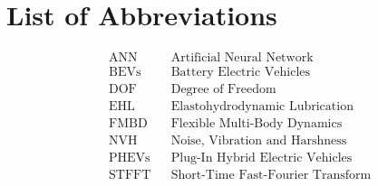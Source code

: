 
\chapter*{List of Abbreviations}
\begin{align*}
	&\text{ANN} &&\text{Artificial Neural Network}\\
	&\text{BEVs} &&\text{Battery Electric Vehicles}\\
	&\text{DOF} &&\text{Degree of Freedom}\\
	&\text{EHL} &&\text{Elastohydrodynamic Lubrication}\\
	&\text{FMBD} &&\text{Flexible Multi-Body Dynamics}\\
	&\text{NVH} &&\text{Noise, Vibration and Harshness}\\
	&\text{PHEVs} &&\text{Plug-In Hybrid Electric Vehicles}\\
	&\text{STFFT} &&\text{Short-Time Fast-Fourier Transform}\\
\end{align*}
